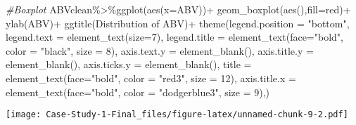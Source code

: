 \documentclass[
]{article}
\newenvironment{Shaded}{\begin{snugshade}}{\end{snugshade}}
\newcommand{\AttributeTok}[1]{\textcolor[rgb]{0.77,0.63,0.00}{#1}}
\newcommand{\CommentTok}[1]{\textcolor[rgb]{0.56,0.35,0.01}{\textit{#1}}}
\newcommand{\DecValTok}[1]{\textcolor[rgb]{0.00,0.00,0.81}{#1}}
\newcommand{\FunctionTok}[1]{\textcolor[rgb]{0.00,0.00,0.00}{#1}}
\newcommand{\NormalTok}[1]{#1}
\newcommand{\OtherTok}[1]{\textcolor[rgb]{0.56,0.35,0.01}{#1}}
\newcommand{\SpecialCharTok}[1]{\textcolor[rgb]{0.00,0.00,0.00}{#1}}
\newcommand{\StringTok}[1]{\textcolor[rgb]{0.31,0.60,0.02}{#1}}
\begin{document}
\begin{Shaded}
\begin{Highlighting}[]
\CommentTok{\#Boxplot}
\NormalTok{ABVclean}\SpecialCharTok{\%\textgreater{}\%}\FunctionTok{ggplot}\NormalTok{(}\FunctionTok{aes}\NormalTok{(}\AttributeTok{x=}\NormalTok{ABV))}\SpecialCharTok{+}
  \FunctionTok{geom\_boxplot}\NormalTok{(}\FunctionTok{aes}\NormalTok{(),}\AttributeTok{fill=}\StringTok{\textquotesingle{}red\textquotesingle{}}\NormalTok{)}\SpecialCharTok{+}
  \FunctionTok{ylab}\NormalTok{(}\StringTok{\textquotesingle{}ABV\textquotesingle{}}\NormalTok{)}\SpecialCharTok{+}
  \FunctionTok{ggtitle}\NormalTok{(}\StringTok{\textquotesingle{}Distribution of ABV\textquotesingle{}}\NormalTok{)}\SpecialCharTok{+}
  \FunctionTok{theme}\NormalTok{(}\AttributeTok{legend.position =} \StringTok{"bottom"}\NormalTok{,}
        \AttributeTok{legend.text =} \FunctionTok{element\_text}\NormalTok{(}\AttributeTok{size=}\DecValTok{7}\NormalTok{),}
        \AttributeTok{legend.title =} \FunctionTok{element\_text}\NormalTok{(}\AttributeTok{face=}\StringTok{"bold"}\NormalTok{, }\AttributeTok{color =} \StringTok{"black"}\NormalTok{, }\AttributeTok{size =} \DecValTok{8}\NormalTok{),}
        \AttributeTok{axis.text.y =} \FunctionTok{element\_blank}\NormalTok{(),}
        \AttributeTok{axis.title.y =} \FunctionTok{element\_blank}\NormalTok{(),}
        \AttributeTok{axis.ticks.y =} \FunctionTok{element\_blank}\NormalTok{(),}
        \AttributeTok{title =} \FunctionTok{element\_text}\NormalTok{(}\AttributeTok{face=}\StringTok{"bold"}\NormalTok{, }\AttributeTok{color =} \StringTok{"red3"}\NormalTok{, }\AttributeTok{size =} \DecValTok{12}\NormalTok{),}
        \AttributeTok{axis.title.x =} \FunctionTok{element\_text}\NormalTok{(}\AttributeTok{face=}\StringTok{"bold"}\NormalTok{, }\AttributeTok{color =} \StringTok{"dodgerblue3"}\NormalTok{, }\AttributeTok{size =} \DecValTok{9}\NormalTok{),)}
\end{Highlighting}
\end{Shaded}

\texttt{[image: Case-Study-1-Final\_files/figure-latex/unnamed-chunk-9-2.pdf]}

\begin{Shaded}
\end{Shaded}
\end{document}
